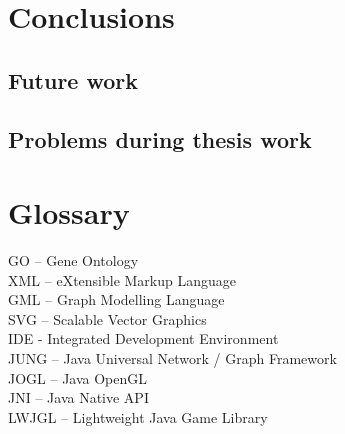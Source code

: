 \documentclass[a4paper,oneside]{article}
\begin{document}
\section{Conclusions}
\subsection{Future work}
\subsection{Problems during thesis work}

\section*{Glossary}
GO -- Gene Ontology\\
XML -- eXtensible Markup Language\\
GML -- Graph Modelling Language\\
SVG -- Scalable Vector Graphics\\
IDE - Integrated Development Environment \\
JUNG -- Java Universal Network / Graph Framework\\
JOGL -- Java OpenGL\\
JNI -- Java Native API\\
LWJGL -- Lightweight Java Game Library\\
\end{document}

